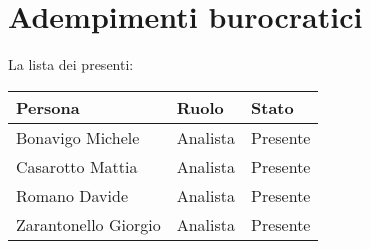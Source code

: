 \section{Adempimenti burocratici}

La lista dei presenti:

\begin{center}
    \begin{tabularx}{\linewidth}{X l l}
        \textbf{Persona} & \textbf{Ruolo} & \textbf{Stato}\\

        \hline

        Bonavigo Michele & Analista & Presente\\
        Casarotto Mattia & Analista & Presente\\
        Romano Davide & Analista & Presente\\
        Zarantonello Giorgio & Analista & Presente\\

    \end{tabularx}
\end{center}